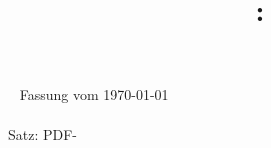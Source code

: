 \documentclass{diplom-mi-eng}
\title{\projectName: \projectSubline}
\newcommand{\todos}{\newpage\listoftodos[Todos]}
\begin{document}
\renewcommand{\contentsname}{Inhaltsverzeichnis}
\frontmatter %

\maketitle	%

\clearpage
\thispagestyle{empty}
{	\small\sffamily
	\flushleft
	~\vfill
	Fassung vom \today\\[1cm]
	\copyrightinfo\\[.5cm]	%
	Satz: PDF-\LaTeXe
}





\tableofcontents

\mainmatter %
























\todos

\appendix		%


\backmatter %

\listoffigures	%
\listoftables	%

%


\cleardoublepage
\clearscrheadfoot
\end{document}
